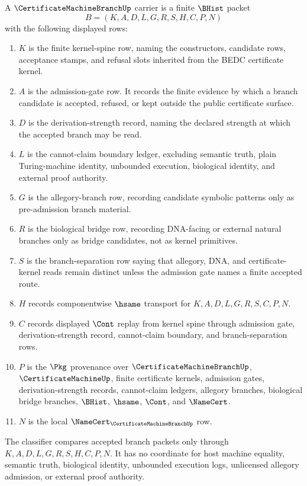 \begin{definition}\label{def:certificate-machine-branch-carrier}
A $\CertificateMachineBranchUp$ carrier is a finite $\BHist$ packet
$$
B=(K,A,D,L,G,R,S,H,C,P,N)
$$
with the following displayed rows:
\begin{enumerate}
\item $K$ is the finite kernel-spine row, naming the constructors, candidate rows, acceptance stamps, and refusal slots inherited from the BEDC certificate kernel.
\item $A$ is the admission-gate row. It records the finite evidence by which a branch candidate is accepted, refused, or kept outside the public certificate surface.
\item $D$ is the derivation-strength record, naming the declared strength at which the accepted branch may be read.
\item $L$ is the cannot-claim boundary ledger, excluding semantic truth, plain Turing-machine identity, unbounded execution, biological identity, and external proof authority.
\item $G$ is the allegory-branch row, recording candidate symbolic patterns only as pre-admission branch material.
\item $R$ is the biological bridge row, recording DNA-facing or external natural branches only as bridge candidates, not as kernel primitives.
\item $S$ is the branch-separation row saying that allegory, DNA, and certificate-kernel reads remain distinct unless the admission gate names a finite accepted route.
\item $H$ records componentwise $\hsame$ transport for $K,A,D,L,G,R,S,C,P,N$.
\item $C$ records displayed $\Cont$ replay from kernel spine through admission gate, derivation-strength record, cannot-claim boundary, and branch-separation rows.
\item $P$ is the $\Pkg$ provenance over $\CertificateMachineBranchUp$, $\CertificateMachineUp$, finite certificate kernels, admission gates, derivation-strength records, cannot-claim ledgers, allegory branches, biological bridge branches, $\BHist$, $\hsame$, $\Cont$, and $\NameCert$.
\item $N$ is the local $\NameCert_{\CertificateMachineBranchUp}$ row.
\end{enumerate}
The classifier compares accepted branch packets only through $K,A,D,L,G,R,S,H,C,P,N$. It has no coordinate for host machine equality, semantic truth, biological identity, unbounded execution logs, unlicensed allegory admission, or external proof authority.
\end{definition}

